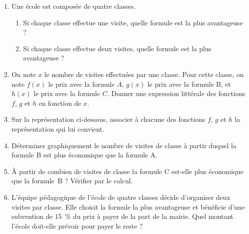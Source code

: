\documentclass[a4paper,12pt,fleqn]{memoir}
\begin{document}
\medskip
\begin{enumerate}
	\item Une école est composée de quatre classes.
	\begin{enumerate}
		\item Si chaque classe effectue une visite, quelle formule est la plus avantageuse ? 
		\item Si chaque classe effectue deux visites, quelle formule est la plus avantageuse ?
	\end{enumerate}
	\item On note $x$ le nombre de visites effectuées par une classe. Pour cette classe, on note $f(x)$ le prix avec la formule $A$, $g(x)$ le prix avec la formule B, et $h(x)$ le prix avec la formule $C$. Donner une expression littérale des fonctions $f$, $g$ et $h$ en fonction de $x$.
	\item Sur la représentation ci-dessous, associer à chacune des fonctions $f$, $g$ et $h$ la représentation qui lui convient.  
	
\item Déterminer graphiquement le nombre de visites de classe à partir duquel la formule B est plus économique que la formule A.
	\item À partir de combien de visites de classe la formule C est-elle plus économique que la formule~B ? Vérifier par le calcul.

	\item L'équipe pédagogique de l'école de quatre classes décide d'organiser deux visites par classe. Elle choisit la formule la plus avantageuse et bénéficie d'une subvention de 15~\% du prix à payer de la part de la mairie. Quel montant l'école doit-elle prévoir pour payer le reste ?
\end{enumerate}
\end{document}

